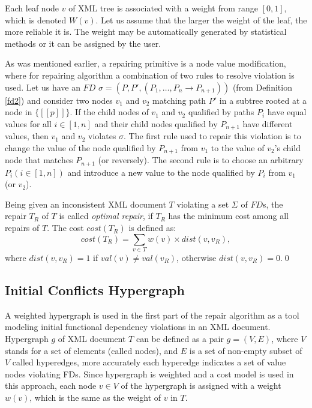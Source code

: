 Each leaf node $v$ of XML tree is associated with a weight from range $[0,1]$, which is denoted $W(v)$. Let us assume that the larger the weight of the leaf, the more reliable it is. The weight may be automatically generated by statistical methods or it can be assigned by the user.

As was mentioned earlier, a repairing primitive is a node value modification, where for repairing algorithm a combination of two rules to resolve violation is used. Let us have an $FD$ $\sigma = (P, P', (P_1, \dots, P_n \rightarrow P_{n+1}))$ (from Definition \ref{fd2}) and consider two nodes $v_1$ and $v_2$ matching path $P'$ in a subtree rooted at a node in $\{[\![p]\!]\}$. If the child nodes of $v_1$ and $v_2$ qualified by paths $P_i$ have equal values for all $i \in [1,n]$ and their child nodes qualified by $P_{n+1}$ have different values, then $v_1$ and $v_2$ violates $\sigma$. The first rule used to repair this violation is to change the value of the node qualified by $P_{n+1}$ from $v_1$ to the value of $v_2$'s child node that matches $P_{n+1}$ (or reversely). The second rule is to choose an arbitrary $P_i (i \in [1,n])$ and introduce a new value to the node qualified by $P_i$ from $v_1$ (or $v_2$).

\begin{define}
Being given an inconsistent XML document $T$ violating a set $\Sigma$ of $FD$s, the repair $T_R$ of $T$ is called {\sl optimal repair}, if $T_R$ has the minimum cost among all repairs of $T$. The cost $cost(T_R)$ is defined as:
\begin{displaymath}
cost(T_R) = \sum_{v \in T} w(v) \times dist(v, v_R),
\end{displaymath}
where $dist(v, v_R)=1$ if $val(v) \neq val(v_R)$, otherwise $dist(v, v_R)=0$.\qed
\end{define}

\subsection{Initial Conflicts Hypergraph}

A weighted hypergraph is used in the first part of the repair algorithm as a tool modeling initial functional dependency violations in an XML document. Hypergraph $g$ of XML document $T$ can be defined as a pair $g = (V,E)$, where $V$ stands for a set of elements (called nodes), and $E$ is a set of non-empty subset of $V$ called hyperedges, more accurately each hyperedge indicates a set of value nodes violating FDs. Since hypergraph is weighted and a cost model is used in this approach, each node $v \in V$ of the hypergraph is assigned with a weight $w(v)$, which is the same as the weight of $v$ in $T$.\\

